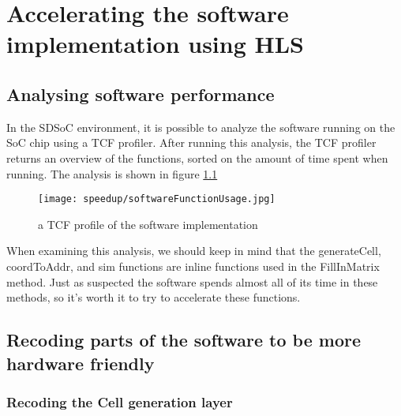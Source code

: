 

\chapter{Accelerating the software implementation using HLS}
\label{ch:HardwareImpl}

\section{Analysing software performance}
\label{swAnalyse}

In the SDSoC environment, it is possible to analyze the software running on the SoC chip using a TCF profiler. After running this analysis, the TCF profiler returns an overview of the functions, sorted on the amount of time spent when running. The analysis is shown in figure \ref{fig:softwareFunctionUsage}

\begin{figure}[H]
	\centering
	\texttt{[image: speedup/softwareFunctionUsage.jpg]}
	\caption{a TCF profile of the software implementation}
	\label{fig:softwareFunctionUsage}
\end{figure}

When examining this analysis, we should keep in mind that the generateCell, coordToAddr, and sim functions are inline functions used in the FillInMatrix method. Just as suspected the software spends almost all of its time in these methods, so it's worth it to try to accelerate these functions.

\section{Recoding parts of the software to be more hardware friendly}

\subsection{Recoding the Cell generation layer}

